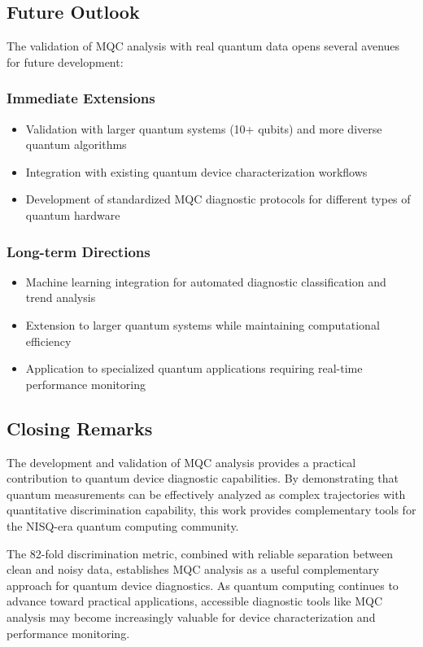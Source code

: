 \subsection{Future Outlook}

The validation of MQC analysis with real quantum data opens several avenues for future development:

\subsubsection{Immediate Extensions}
\begin{itemize}
\item Validation with larger quantum systems (10+ qubits) and more diverse quantum algorithms
\item Integration with existing quantum device characterization workflows
\item Development of standardized MQC diagnostic protocols for different types of quantum hardware
\end{itemize}

\subsubsection{Long-term Directions}
\begin{itemize}
\item Machine learning integration for automated diagnostic classification and trend analysis
\item Extension to larger quantum systems while maintaining computational efficiency
\item Application to specialized quantum applications requiring real-time performance monitoring
\end{itemize}

\subsection{Closing Remarks}

The development and validation of MQC analysis provides a practical contribution to quantum device diagnostic capabilities. By demonstrating that quantum measurements can be effectively analyzed as complex trajectories with quantitative discrimination capability, this work provides complementary tools for the NISQ-era quantum computing community.

The 82-fold discrimination metric, combined with reliable separation between clean and noisy data, establishes MQC analysis as a useful complementary approach for quantum device diagnostics. As quantum computing continues to advance toward practical applications, accessible diagnostic tools like MQC analysis may become increasingly valuable for device characterization and performance monitoring.

